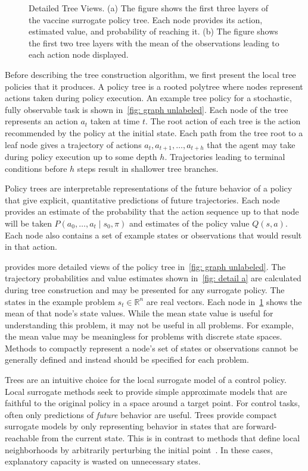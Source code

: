 \documentclass[letterpaper]{article} %
\begin{document}
\begin{figure}[ht!]
\begin{subfigure}[t]{0.43\textwidth}
    \caption{}\label{fig: detail b}
    \end{subfigure}
    \caption{Detailed Tree Views. (a) The figure shows the first three layers of the vaccine surrogate policy tree. Each node provides its action, estimated value, and probability of reaching it. (b) The figure shows the first two tree layers with the mean of the observations leading to each action node displayed.
        }
    \label{fig: example graph}
\end{figure}
Before describing the tree construction algorithm, we first present the local tree policies that it produces.
A policy tree is a rooted polytree where nodes represent actions taken during policy execution.
An example tree policy for a stochastic, fully observable task is shown in~\cref{fig: graph unlabeled}.
Each node of the tree represents an action $a_t$ taken at time $t$.
The root action of each tree is the action recommended by the policy at the initial state.
Each path from the tree root to a leaf node gives a trajectory of actions $a_t, a_{t+1}, \dots, a_{t + h}$ that the agent may take during policy execution up to some depth $h$.
Trajectories leading to terminal conditions before $h$ steps result in shallower tree branches.

Policy trees are interpretable representations of the future behavior of a policy that give explicit, quantitative predictions of future trajectories.
Each node provides an estimate of the probability that the action sequence up to that node will be taken $P(a_0, \dots, a_t \mid s_0, \pi)$ and estimates of the policy value $Q(s, a)$.
Each node also contains a set of example states or observations that would result in that action.

 provides more detailed views of the policy tree in~\cref{fig: graph unlabeled}.
The trajectory probabilities and value estimates shown in~\cref{fig: detail a} are calculated during tree construction and may be presented for any surrogate policy.
The states in the example problem $s_t \in \mathbb{R}^{n}$ are real vectors.
Each node in~\cref{fig: detail b} shows the mean of that node's state values.
While the mean state value is useful for understanding this problem, it may not be useful in all problems.
For example, the mean value may be meaningless for problems with discrete state spaces.
Methods to compactly represent a node's set of states or observations cannot be generally defined and instead should be specified for each problem.

Trees are an intuitive choice for the local surrogate model of a control policy.
Local surrogate methods seek to provide simple approximate models that are faithful to the original policy in a space around a target point.
For control tasks, often only predictions of \emph{future} behavior are useful.
Trees provide compact surrogate models by only representing behavior in states that are forward-reachable from the current state.
This is in contrast to methods that define local neighborhoods by arbitrarily perturbing the initial point~\cite{ribeiro2016}.
In these cases, explanatory capacity is wasted on unnecessary states.
\end{document}
